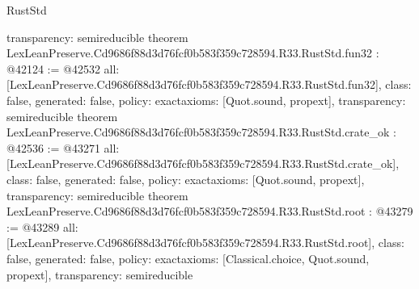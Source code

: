\begin{lexlean}{RustStd}
\begin{coremodule}
{  transparency: semireducible
}
theorem LexLeanPreserve.Cd9686f88d3d76fcf0b583f359c728594.R33.RustStd.fun32 : @42124 := @42532 {
  all: [LexLeanPreserve.Cd9686f88d3d76fcf0b583f359c728594.R33.RustStd.fun32],
  class: false,
  generated: false,
  policy: exact{axioms: [Quot.sound, propext]},
  transparency: semireducible
}
theorem LexLeanPreserve.Cd9686f88d3d76fcf0b583f359c728594.R33.RustStd.crate_ok : @42536 := @43271 {
  all: [LexLeanPreserve.Cd9686f88d3d76fcf0b583f359c728594.R33.RustStd.crate_ok],
  class: false,
  generated: false,
  policy: exact{axioms: [Quot.sound, propext]},
  transparency: semireducible
}
theorem LexLeanPreserve.Cd9686f88d3d76fcf0b583f359c728594.R33.RustStd.root : @43279 := @43289 {
  all: [LexLeanPreserve.Cd9686f88d3d76fcf0b583f359c728594.R33.RustStd.root],
  class: false,
  generated: false,
  policy: exact{axioms: [Classical.choice, Quot.sound, propext]},
  transparency: semireducible
}


\end{coremodule}
\end{lexlean}
